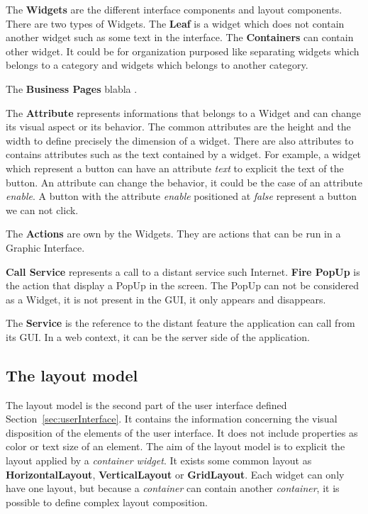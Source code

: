 \documentclass[conference]{IEEEtran}
\begin{document}
The \textbf{Widgets} are the different interface components and layout components.
There are two types of Widgets.
The \textbf{Leaf} is a widget which does not contain another widget such as some text in the interface. 
The \textbf{Containers} can contain other widget. 
It could be for organization purposed like separating widgets which belongs to a category and widgets which belongs to another category.

The \textbf{Business Pages} blabla .

The \textbf{Attribute} represents informations that belongs to a Widget and can change its visual aspect or its behavior.
The common attributes are the height and the width to define precisely the dimension of a widget.
There are also attributes to contains attributes such as the text contained by a widget. 
For example, a widget which represent a button can have an attribute \textit{text} to 
    explicit the text of the button.
An attribute can change the behavior, it could be the case of an attribute \textit{enable}.
A button with the attribute \textit{enable} positioned at \textit{false} represent a button
    we can not click.

The \textbf{Actions} are own by the Widgets.
They are actions that can be run in a Graphic Interface.

\textbf{Call Service} represents a call to a distant service such Internet.
\textbf{Fire PopUp} is the action that display a PopUp in the screen.
The PopUp can not be considered as a Widget, 
    it is not present in the GUI, 
    it only appears and disappears.

The \textbf{Service} is the reference to the distant feature the application can call from its GUI.
In a web context, it can be the server side of the application.

\subsection{The layout model}
\label{sec:layoutModel}


The layout model is the second part of the user interface defined Section~\ref{sec:userInterface}.
It contains the information concerning the visual disposition of the elements of the user interface.
It does not include properties as color or text size of an element.
The aim of the layout model is to explicit the layout applied by a \textit{container widget}.
It exists some common layout as \textbf{HorizontalLayout}, \textbf{VerticalLayout} or \textbf{GridLayout}.
Each widget can only have one layout,
    but because a \textit{container} can contain another \textit{container},
    it is possible to define complex layout composition.
\end{document}
